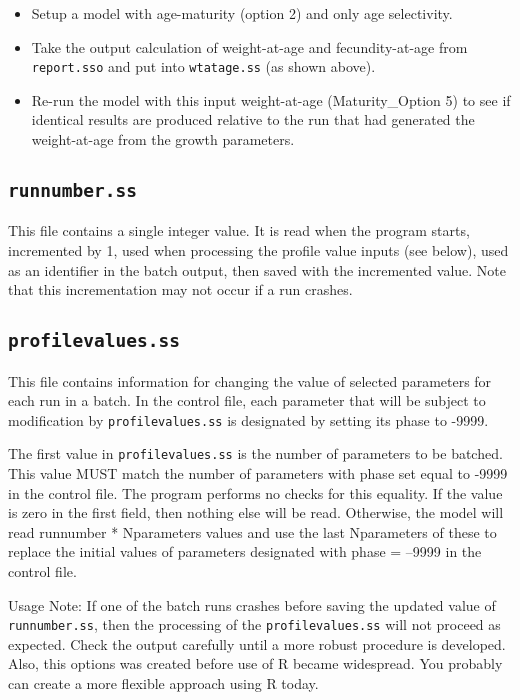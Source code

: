 		\begin{itemize}
			\item Setup a model with age-maturity (option 2) and only age selectivity.
			\item Take the output calculation of weight-at-age and fecundity-at-age  from \verb|report.sso| and put into \verb|wtatage.ss| (as shown above).
			\item Re-run the model with this input weight-at-age (Maturity\_Option 5) to see if identical results are produced relative to the run that had generated the weight-at-age from the growth parameters.
		\end{itemize}


\subsection{\texttt{runnumber.ss}}
This file contains a single integer value. It is read when the program starts, incremented by 1, used when processing the profile value inputs (see below), used as an identifier in the batch output, then saved with the incremented value. Note that this incrementation may not occur if a run crashes.

\subsection{\texttt{profilevalues.ss}}	
This file contains information for changing the value of selected parameters for each run in a batch. In the control file, each parameter that will be subject to modification by \texttt{profilevalues.ss} is designated by setting its phase to -9999.

The first value in \texttt{profilevalues.ss} is the number of parameters to be batched. This value MUST match the number of parameters with phase set equal to -9999 in the control file. The program performs no checks for this equality. If the value is zero in the first field, then nothing else will be read. Otherwise, the model will read runnumber * Nparameters values and use the last Nparameters of these to replace the initial values of parameters designated with phase = --9999 in the control file.

Usage Note: If one of the batch runs crashes before saving the updated value of \texttt{runnumber.ss}, then the processing of the \verb|profilevalues.ss| will not proceed as expected. Check the output carefully until a more robust procedure is developed. Also, this options was created before use of R became widespread. You probably can create a more flexible approach using R today.


\pagebreak